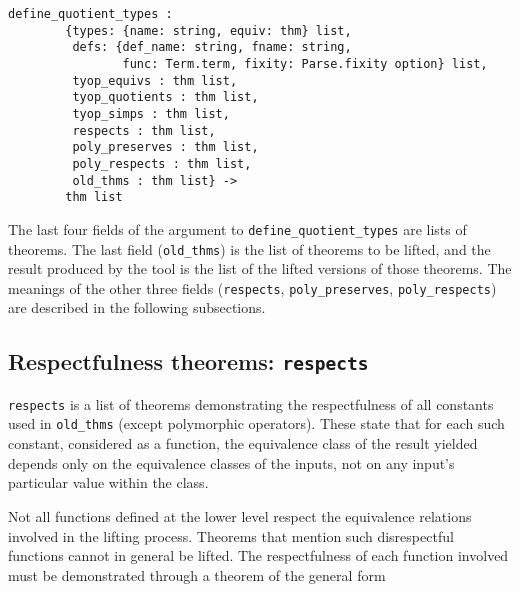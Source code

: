 \documentclass[envcountsame,runningheads]{llncs}
\begin{document}
\begin{verbatim}
define_quotient_types :
        {types: {name: string, equiv: thm} list,
         defs: {def_name: string, fname: string,
                func: Term.term, fixity: Parse.fixity option} list,
         tyop_equivs : thm list,
         tyop_quotients : thm list,
         tyop_simps : thm list,
         respects : thm list,
         poly_preserves : thm list,
         poly_respects : thm list,
         old_thms : thm list} ->
        thm list
\end{verbatim}

\noindent
The last four fields of the argument to {\tt define\_quotient\_types}
are lists of theorems.  The last field ({\tt old\_thms})
is the list of theorems to be lifted, and the
result produced by the tool is
the list of the lifted versions of those theorems.
The meanings of the other three fields
({\tt respects}, {\tt poly\_preserves}, {\tt poly\_respects})
are described in the following subsections.




%
\subsection{Respectfulness theorems: {\tt respects}}
%
\label{respectfulness}

{\tt respects} is a list of theorems demonstrating the
respectfulness of all constants used in {\tt old\_thms}
(except polymorphic operators).
These state that for each such constant,
considered as a function,
the equivalence class of the result yielded
depends only on the equivalence classes of the inputs,
not on any input's particular
value
within the class.

Not all functions defined at the lower level
respect the equivalence relations involved in the
lifting process.  Theorems that mention such disrespectful functions
cannot in general be lifted.
The respectfulness of each function involved must be
demonstrated through a theorem of the general form
\end{document}
